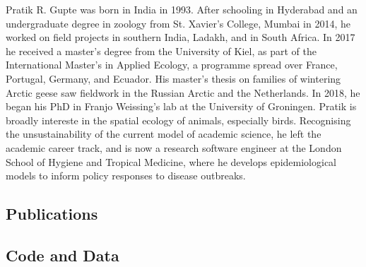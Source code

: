 \label{ch:pubs}

Pratik R. Gupte was born in India in 1993.
After schooling in Hyderabad and an undergraduate degree in zoology from St. Xavier's College, Mumbai in 2014, he worked on field projects in southern India, Ladakh, and in South Africa.
In 2017 he received a master's degree from the University of Kiel, as part of the International Master's in Applied Ecology, a programme spread over France, Portugal, Germany, and Ecuador.
His master's thesis on families of wintering Arctic geese saw fieldwork in the Russian Arctic and the Netherlands.
In 2018, he began his PhD in Franjo Weissing's lab at the University of Groningen.
Pratik is broadly intereste in the spatial ecology of animals, especially birds.
Recognising the unsustainability of the current model of academic science, he left the academic career track, and is now a research software engineer at the London School of Hygiene and Tropical Medicine, where he develops epidemiological models to inform policy responses to disease outbreaks.

\subsection*{Publications}

\begin{refsection}
    \small
    \toggletrue{bbx:allnames}
    \nocite{gupte2021a,gupte2022c,gupte2022d,thaker2019,nathan2022,netz2022,ramesh2022,
        bijleveld2021,rimbach2022un,gupte2019} %
    \printbibliography[heading=none]
\end{refsection}

\subsection*{Code and Data}

\begin{refsection}
    \small
    \nocite{gupte2022,gupte2022e,gupte2022b,gupte2021b,gupte2020a,gupte2022f,netz2021b,netz2022a,netz2021b} %
    \printbibliography[heading=none]
\end{refsection}

{ \begin{center}  \end{center} }

